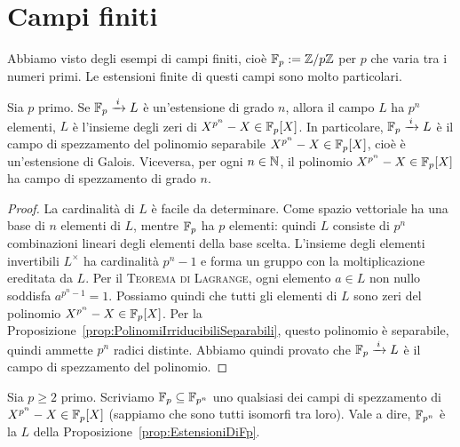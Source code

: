 
\section{Campi finiti}

Abbiamo visto degli esempi di campi finiti, cioè \(\mathbb{F}_p := \mathbb{Z}/p\mathbb{Z}\) per \(p\) che varia tra i numeri primi. Le estensioni finite di questi campi sono molto particolari.

\begin{prop}\label{prop:EstensioniDiFp}
Sia \(p\) primo. Se \(\mathbb{F}_p \xrightarrow{\,i\,} L\) è un'estensione di grado \(n\), allora il campo \(L\) ha \(p^n\) elementi, \(L\) è l'insieme degli zeri di \(X^{p^n}-X \in \mathbb{F}_p[X]\). In particolare, \(\mathbb{F}_p \xrightarrow{\,i\,} L\) è il campo di spezzamento del polinomio separabile \(X^{p^n}-X \in \mathbb{F}_p[X]\), cioè è un'estensione di Galois. Viceversa, per ogni \(n \in \mathbb{N}\), il polinomio \(X^{p^n}-X \in \mathbb{F}_p[X]\) ha campo di spezzamento di grado \(n\).
\end{prop}


\begin{proof}
La cardinalità di \(L\) è facile da determinare. Come spazio vettoriale ha una base di \(n\) elementi di \(L\), mentre \(\mathbb{F}_p\) ha \(p\) elementi: quindi \(L\) consiste di \(p^n\) combinazioni lineari degli elementi della base scelta. L'insieme degli elementi invertibili \(L^\times\) ha cardinalità \(p^n-1\) e forma un gruppo con la moltiplicazione ereditata da \(L\). Per il {\scshape Teorema di Lagrange}, ogni elemento \(a \in L\) non nullo soddisfa \(a^{p^n-1} = 1\). Possiamo quindi che tutti gli elementi di \(L\) sono zeri del polinomio \(X^{p^n}-X \in \mathbb{F}_p[X]\). Per la Proposizione~\ref{prop:PolinomiIrriducibiliSeparabili}, questo polinomio è separabile, quindi ammette \(p^n\) radici distinte. Abbiamo quindi provato che \(\mathbb{F}_p \xrightarrow{\,i\,} L\) è il campo di spezzamento del polinomio. 
\end{proof}

\begin{defi}
Sia \(p \ge 2\) primo. Scriviamo \(\mathbb{F}_p \subseteq \mathbb{F}_{p^n}\) uno qualsiasi dei campi di spezzamento di \(X^{p^n}-X \in \mathbb{F}_p[X]\) (sappiamo che sono tutti isomorfi tra loro). Vale a dire, \(\mathbb{F}_{p^n}\) è la \(L\) della Proposizione~\ref{prop:EstensioniDiFp}.
\end{defi}

